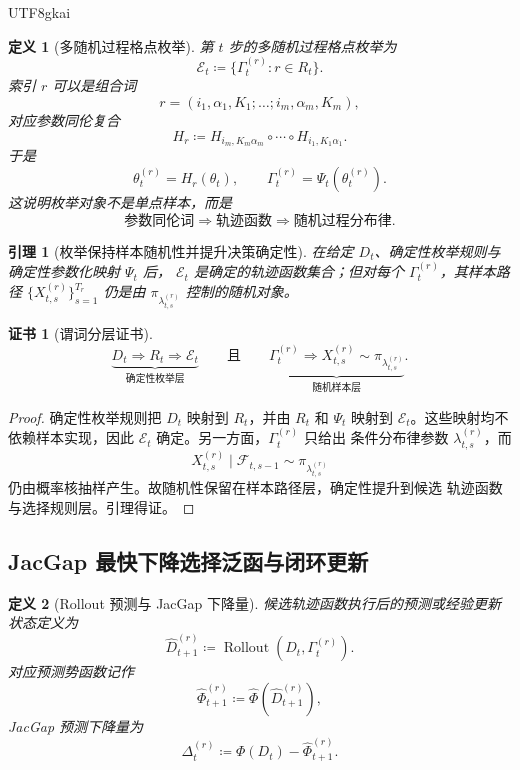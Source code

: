 \documentclass[12pt]{article}
\newtheorem{definition}{定义}[section]
\newtheorem{lemma}{引理}[section]
\newtheorem{Certificate}{证书}[section]
\newcommand{\DefEq}{\coloneqq}
\newcommand{\Fil}{\mathcal F}
\DeclareMathOperator{\Rollout}{Rollout}
\begin{document}
\begin{CJK*}{UTF8}{gkai}
\begin{definition}[多随机过程格点枚举]
第 \(t\) 步的多随机过程格点枚举为
\[
\boxed{
\mathcal E_t
\DefEq
\{\Gamma_t^{(r)}:r\in R_t\}.
}
\]
索引 \(r\) 可以是组合词
\[
r=(i_1,\alpha_1,K_1;\ldots;i_m,\alpha_m,K_m),
\]
对应参数同伦复合
\[
H_r
\DefEq
H_{i_m,K_m\alpha_m}
\circ\cdots\circ
H_{i_1,K_1\alpha_1}.
\]
于是
\[
\theta_t^{(r)}=H_r(\theta_t),
\qquad
\Gamma_t^{(r)}=\Psi_t(\theta_t^{(r)}).
\]
这说明枚举对象不是单点样本，而是
\[
\boxed{
\text{参数同伦词}
\Longrightarrow
\text{轨迹函数}
\Longrightarrow
\text{随机过程分布律}.
}
\]
\end{definition}

\begin{lemma}[枚举保持样本随机性并提升决策确定性]
在给定 \(D_t\)、确定性枚举规则与确定性参数化映射 \(\Psi_t\) 后，
\(\mathcal E_t\) 是确定的轨迹函数集合；但对每个
\(\Gamma_t^{(r)}\)，其样本路径
\(\{X_{t,s}^{(r)}\}_{s=1}^{T_r}\) 仍是由
\(\pi_{\lambda_{t,s}^{(r)}}\) 控制的随机对象。
\end{lemma}

\begin{Certificate}[谓词分层证书]
\[
\boxed{
\underbrace{D_t\Rightarrow R_t\Rightarrow\mathcal E_t}_{\text{确定性枚举层}}
\qquad
\text{且}
\qquad
\underbrace{\Gamma_t^{(r)}\Rightarrow
X_{t,s}^{(r)}\sim\pi_{\lambda_{t,s}^{(r)}}}_{\text{随机样本层}}.
}
\]
\end{Certificate}

\begin{proof}
确定性枚举规则把 \(D_t\) 映射到 \(R_t\)，并由 \(R_t\) 和 \(\Psi_t\)
映射到 \(\mathcal E_t\)。这些映射均不依赖样本实现，因此
\(\mathcal E_t\) 确定。另一方面，\(\Gamma_t^{(r)}\) 只给出
条件分布律参数 \(\lambda_{t,s}^{(r)}\)，而
\[
X_{t,s}^{(r)}\mid\Fil_{t,s-1}\sim\pi_{\lambda_{t,s}^{(r)}}
\]
仍由概率核抽样产生。故随机性保留在样本路径层，确定性提升到候选
轨迹函数与选择规则层。引理得证。
\end{proof}

\subsection{JacGap 最快下降选择泛函与闭环更新}
\label{subsec:jacgap-fastest-selection}

\begin{definition}[Rollout 预测与 JacGap 下降量]
候选轨迹函数执行后的预测或经验更新状态定义为
\[
\widehat D_{t+1}^{(r)}
\DefEq
\Rollout(D_t,\Gamma_t^{(r)}).
\]
对应预测势函数记作
\[
\widehat\Phi_{t+1}^{(r)}
\DefEq
\widehat\Phi(\widehat D_{t+1}^{(r)}),
\]
JacGap 预测下降量为
\[
\Delta_t^{(r)}
\DefEq
\Phi(D_t)-\widehat\Phi_{t+1}^{(r)}.
\]
\end{definition}


\end{CJK*}
\end{document}
